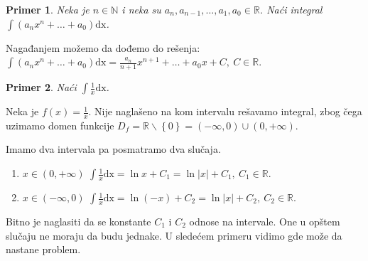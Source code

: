 \documentclass{article}
\newtheorem{prim}{Primer}[section]
\begin{document}
\begin{primbox}
    \label{primer_1.3}
    \begin{prim}
        Neka je $n \in \mathbb{N}$ i neka su $a_n, a_{n-1},
            \dotsc, a_1, a_0 \in \mathbb{R}$. Naći integral
        $\displaystyle\int \left(a_n  x^n + \dotsc + a_0\right)\text{dx}$.
    \end{prim}
    Nagađanjem možemo da dođemo do rešenja:
    $\displaystyle\int \left(a_n  x^n + \dotsc + a_0\right)\text{dx}=\frac{a_n}{n+1}x^{n+1} + \dotsc +
        a_0x + C,\ C\in\mathbb{R}$.
\end{primbox}

\begin{primbox}
    \label{primer_1.4}
    \begin{prim}
        Naći $\displaystyle\int\frac{1}{x}\text{dx}$.
    \end{prim}
    Neka je $\displaystyle f\left(x\right) = \frac{1}{x}$.
    Nije naglašeno na kom intervalu rešavamo integral, zbog čega uzimamo domen
    funkcije
    $D_f= \mathbb{R}\backslash \left\{0\right\} = \left(-\infty, 0\right)\cup\left(0, +\infty\right)$.\par
    Imamo dva intervala pa posmatramo dva slučaja.
    \begin{enumerate}[leftmargin=2cm, label=\arabic*. slučaj:]
        \item $x \in \left(0, +\infty\right)$ $\displaystyle\int \frac{1}{x}\text{dx} =
                  \ln x + C_1=\ln|x| + C_1,\ C_1\in\mathbb{R}$.
        \item $x \in \left(-\infty, 0\right)$ $\displaystyle\int \frac{1}{x}\text{dx} =
                  \ln\left(-x\right) + C_2=\ln|x| + C_2,\ C_2\in\mathbb{R}$.
    \end{enumerate}
\end{primbox}

Bitno je naglasiti da se konstante $C_1$ i $C_2$ odnose na intervale. One
u opštem slučaju ne moraju da budu jednake.
U sledećem primeru vidimo gde može da nastane problem.
\end{document}
